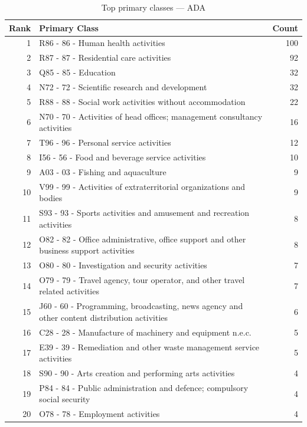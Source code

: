\begin{table}[H]
    \centering
    \begin{tabular}{r p{10cm} r}
    \hline
    \textbf{Rank} & \textbf{Primary Class} & \textbf{Count} \\
    \hline
    1 & R86 - 86 - Human health activities & 100 \\
    2 & R87 - 87 - Residential care activities & 92 \\
    3 & Q85 - 85 - Education & 32 \\
    4 & N72 - 72 - Scientific research and development & 32 \\
    5 & R88 - 88 - Social work activities without accommodation & 22 \\
    6 & N70 - 70 - Activities of head offices; management consultancy activities & 16 \\
    7 & T96 - 96 - Personal service activities & 12 \\
    8 & I56 - 56 - Food and beverage service activities & 10 \\
    9 & A03 - 03 - Fishing and aquaculture & 9 \\
    10 & V99 - 99 - Activities of extraterritorial organizations and bodies & 9 \\
    11 & S93 - 93 - Sports activities and amusement and recreation activities & 8 \\
    12 & O82 - 82 - Office administrative, office support and other business support activities & 8 \\
    13 & O80 - 80 - Investigation and security activities & 7 \\
    14 & O79 - 79 - Travel agency, tour operator, and other travel related activities & 7 \\
    15 & J60 - 60 - Programming, broadcasting, news agency and other content distribution activities & 6 \\
    16 & C28 - 28 - Manufacture of machinery and equipment n.e.c. & 5 \\
    17 & E39 - 39 - Remediation and other waste management service activities & 5 \\
    18 & S90 - 90 - Arts creation and performing arts activities & 4 \\
    19 & P84 - 84 - Public administration and defence; compulsory social security & 4 \\
    20 & O78 - 78 - Employment activities & 4 \\
    \hline
    \end{tabular}
    \caption{Top primary classes --- ADA}
\end{table}

